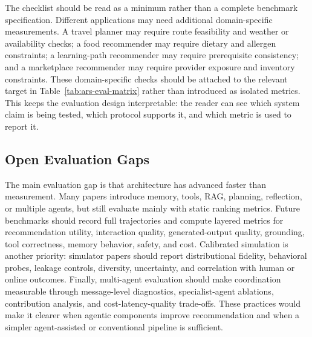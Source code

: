 The checklist should be read as a minimum rather than a complete benchmark specification. Different applications may need additional domain-specific measurements. A travel planner may require route feasibility and weather or availability checks; a food recommender may require dietary and allergen constraints; a learning-path recommender may require prerequisite consistency; and a marketplace recommender may require provider exposure and inventory constraints. These domain-specific checks should be attached to the relevant target in Table~\ref{tab:ars-eval-matrix} rather than introduced as isolated metrics. This keeps the evaluation design interpretable: the reader can see which system claim is being tested, which protocol supports it, and which metric is used to report it.

\subsection{Open Evaluation Gaps}
\label{subsec:evaluation-future}

The main evaluation gap is that architecture has advanced faster than measurement. Many papers introduce memory, tools, RAG, planning, reflection, or multiple agents, but still evaluate mainly with static ranking metrics. Future benchmarks should record full trajectories and compute layered metrics for recommendation utility, interaction quality, generated-output quality, grounding, tool correctness, memory behavior, safety, and cost. Calibrated simulation is another priority: simulator papers should report distributional fidelity, behavioral probes, leakage controls, diversity, uncertainty, and correlation with human or online outcomes. Finally, multi-agent evaluation should make coordination measurable through message-level diagnostics, specialist-agent ablations, contribution analysis, and cost-latency-quality trade-offs. These practices would make it clearer when agentic components improve recommendation and when a simpler agent-assisted or conventional pipeline is sufficient.
